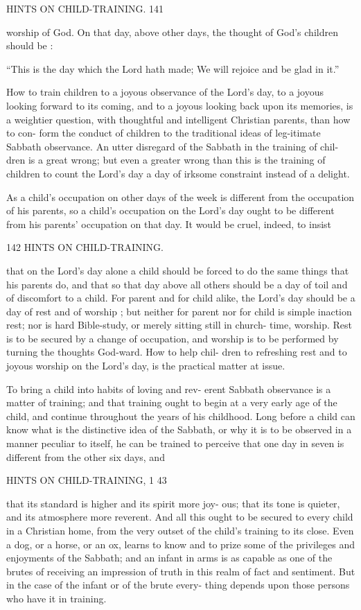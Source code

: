 \documentclass[
]{book}
\begin{document}
HINTS ON CHILD-TRAINING. 141

worship of God. On that day, above other days, the thought of God's children should be :

``This is the day which the Lord hath made; We will rejoice and be glad in it.''

How to train children to a joyous observance of the Lord's day, to a joyous looking forward to its coming, and to a joyous looking back upon its memories, is a weightier question, with thoughtful and intelligent Christian parents, than how to con- form the conduct of children to the traditional ideas of leg-itimate Sabbath observance. An utter disregard of the Sabbath in the training of chil- dren is a great wrong; but even a greater wrong than this is the training of children to count the Lord's day a day of irksome constraint instead of a delight.

As a child's occupation on other days of the week is different from the occupation of his parents, so a child's occupation on the Lord's day ought to be different from his parents' occupation on that day. It would be cruel, indeed, to insist

142 HINTS ON CHILD-TRAINING.

that on the Lord's day alone a child should be forced to do the same things that his parents do, and that so that day above all others should be a day of toil and of discomfort to a child. For parent and for child alike, the Lord's day should be a day of rest and of worship ; but neither for parent nor for child is simple inaction rest; nor is hard Bible-study, or merely sitting still in church- time, worship. Rest is to be secured by a change of occupation, and worship is to be performed by turning the thoughts God-ward. How to help chil- dren to refreshing rest and to joyous worship on the Lord's day, is the practical matter at issue.

To bring a child into habits of loving and rev- erent Sabbath observance is a matter of training; and that training ought to begin at a very early age of the child, and continue throughout the years of his childhood. Long before a child can know what is the distinctive idea of the Sabbath, or why it is to be observed in a manner peculiar to itself, he can be trained to perceive that one day in seven is different from the other six days, and

HINTS ON CHILD-TRAINING, 1 43

that its standard is higher and its spirit more joy- ous; that its tone is quieter, and its atmosphere more reverent. And all this ought to be secured to every child in a Christian home, from the very outset of the child's training to its close. Even a dog, or a horse, or an ox, learns to know and to prize some of the privileges and enjoyments of the Sabbath; and an infant in arms is as capable as one of the brutes of receiving an impression of truth in this realm of fact and sentiment. But in the case of the infant or of the brute every- thing depends upon those persons who have it in training.
\end{document}
